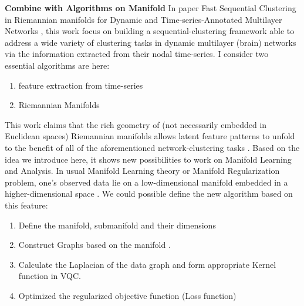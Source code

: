\documentclass{article}
\begin{document}
\textbf{Combine with Algorithms on Manifold}
In paper Fast Sequential Clustering in Riemannian
manifolds for Dynamic and Time-series-Annotated Multilayer Networks \cite{manifold1}, this
work focus on building a sequential-clustering framework able to address
a wide variety of clustering tasks in dynamic multilayer (brain) networks
via the information extracted from their nodal time-series.
I consider two essential algorithms are here:
\begin{enumerate}
  \item feature extraction from time-series
  \item Riemannian Manifolds
\end{enumerate}
This work claims that the rich geometry of 
(not necessarily embedded in Euclidean spaces) Riemannian manifolds 
allows latent feature patterns to unfold to the benefit of all of 
the aforementioned network-clustering tasks \cite{manifold1}.
Based on the idea we introduce here, it shows new possibilities to 
work on Manifold Learning and Analysis. In usual Manifold Learning 
theory or Manifold Regularization problem, one's observed data lie on a 
low-dimensional manifold embedded in a higher-dimensional space \cite{manifold2}. 
We could possible define the new algorithm based on this feature: 
\begin{enumerate}
  \item Define the manifold, submanifold and their dimensions
  \item Construct Graphs based on the manifold \cite{manifold3}. 
  \item Calculate the Laplacian of the data graph and form 
        appropriate Kernel function in VQC. 
  \item Optimized the regularized objective function (Loss function)
\end{enumerate} 
\end{document}
